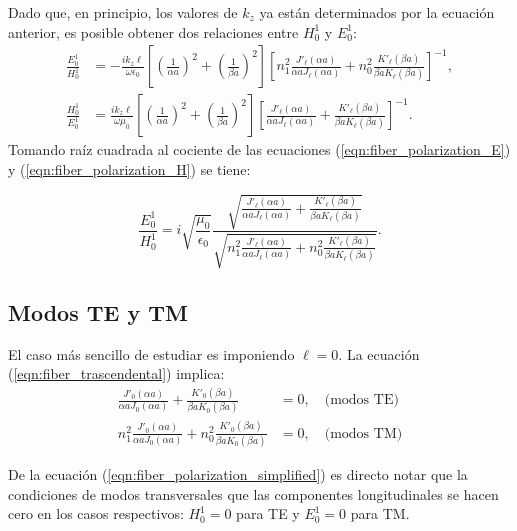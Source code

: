Dado que, en principio, los valores de $k_z$ ya están determinados por la ecuación anterior, es posible obtener dos relaciones entre $H_0^1$ y $E_0^1$:
\begin{align}
\frac{E_0^1}{H_0^1} &=  -\frac{i k_z \ell}{\omega\epsilon_0}\left[ \left(\frac{1}{\alpha a}\right)^2 + \left(\frac{1}{\beta a}\right)^2 \right]  \left[ n_1^2 \frac{J'_\ell(\alpha a)}{\alpha a J_\ell(\alpha a)} + n_0^2 \frac{K'_\ell(\beta a)}{\beta a K_\ell(\beta a)} \right]^{-1} \label{eqn:fiber_polarization_E},
\\
\frac{H_0^1}{E_0^1} &=  \frac{i k_z \ell}{ \omega\mu_0}\left[ \left(\frac{1}{\alpha a}\right)^2 + \left(\frac{1}{\beta a}\right)^2 \right]  \left[ \frac{J'_\ell(\alpha a)}{\alpha a J_\ell(\alpha a)} + \frac{K'_\ell(\beta a)}{\beta a K_\ell(\beta a)} \right]^{-1} \label{eqn:fiber_polarization_H}.
\end{align}
Tomando raíz cuadrada al cociente de las ecuaciones (\ref{eqn:fiber_polarization_E}) y (\ref{eqn:fiber_polarization_H}) se tiene:

\begin{equation}
	\frac{E_0^1}{H_0^1} = i \sqrt{\frac{\mu_0}{\epsilon_0}} \frac{\sqrt{ \frac{J'_\ell(\alpha a)}{\alpha a J_\ell(\alpha a)} + \frac{K'_\ell(\beta a)}{\beta a K_\ell(\beta a)}}}{\sqrt{n_1^2 \frac{J'_\ell(\alpha a)}{\alpha a J_\ell(\alpha a)} + n_0^2 \frac{K'_\ell(\beta a)}{\beta a K_\ell(\beta a)}}}.
	\label{eqn:fiber_polarization_simplified}
\end{equation}

\subsection{Modos TE y TM}
El caso más sencillo de estudiar es imponiendo $\ell = 0$. La ecuación (\ref{eqn:fiber_trascendental}) implica:
\begin{align*}
	\frac{J'_{0}(\alpha a)}{\alpha a J_0(\alpha a)} + \frac{K'_0(\beta a)}{\beta a K_0(\beta a)}&=  0, \quad \text{(modos TE)}
	\\
	n_1^2\frac{J'_{0}(\alpha a)}{\alpha a J_0(\alpha a)} + n_0^2 \frac{K'_0(\beta a)}{\beta a K_0(\beta a)} &= 0, \quad \text{(modos TM)}
\end{align*}

De la ecuación (\ref{eqn:fiber_polarization_simplified}) es directo notar que la condiciones de modos transversales que las componentes longitudinales se hacen cero en los casos respectivos: $H_0^1 = 0$ para TE y $E_0^1 = 0$ para TM.

